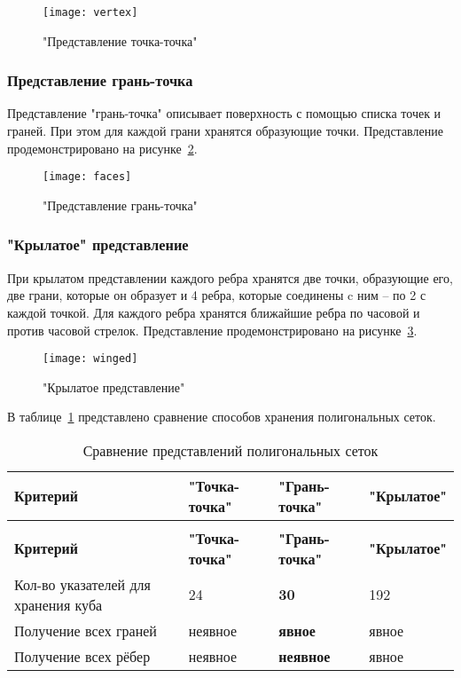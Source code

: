 \begin{figure}[H]
	\centering
	\texttt{[image: vertex]}
	\caption{"Представление точка-точка"}
	\label{fig:vertex-vertex}
\end{figure}


\subsubsection{Представление грань-точка}
Представление "грань-точка" описывает поверхность с помощью списка точек и граней. При этом для каждой грани хранятся образующие точки. Представление продемонстрировано на рисунке~\ref{fig:vertex-face}.

\begin{figure}[H]
	\centering
	\texttt{[image: faces]}
	\caption{"Представление грань-точка"}
	\label{fig:vertex-face}
\end{figure}

\subsubsection{"Крылатое" представление}
При крылатом представлении каждого ребра хранятся две точки, образующие его, две грани, которые он образует и 4 ребра, которые соединены c ним -- по 2 с каждой точкой. Для каждого ребра хранятся ближайшие ребра по часовой и против часовой стрелок.
Представление продемонстрировано на рисунке~\ref{fig:winged}.

\begin{figure}[H]
	\centering
	\texttt{[image: winged]}
	\caption{"Крылатое представление"}
	\label{fig:winged}
\end{figure}

В таблице~\ref{tbl:mesh-structs} представлено сравнение способов хранения полигональных сеток.

\begin{longtable}{|p{}|p{}|p{}|p{}|}
	\caption{Сравнение представлений полигональных сеток} \label{tbl:mesh-structs} 
	\\
	\hline
	\textbf{Критерий} & \textbf{"Точка-точка"} & \textbf{"Грань-точка"} & \textbf{"Крылатое"} \\
	\hline
	\endfirsthead
	\caption{Сравнение представлений полигональных сеток}
	\\
	\hline
	\textbf{Критерий} & \textbf{"Точка-точка"} & \textbf{"Грань-точка"} & \textbf{"Крылатое"} \\
	\hline
	\endhead
	\hline
	\endfoot
	\endlastfoot
	Кол-во указателей для хранения куба\cite{colins} & 24 & \textbf{30} & 192 \\
	\hline
	Получение всех граней & неявное & \textbf{явное} & явное \\
	\hline
	Получение всех рёбер & неявное & \textbf{неявное} & явное \\
	\hline
\end{longtable}

